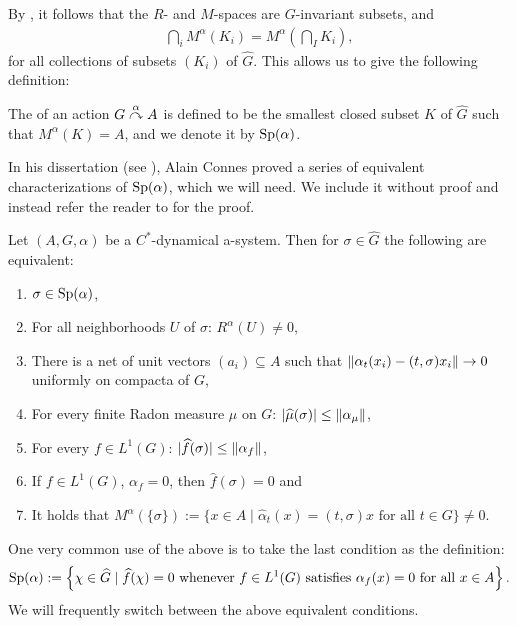 By \cite[Theorem 8.1.4]{pedersenalgauto}, it follows that the $R$- and $M$-spaces are $G$-invariant subsets, and
\begin{align*}
	\bigcap_i M^\alpha(K_i) = M^\alpha(\bigcap_I K_i),
\end{align*}
for all collections of subsets $(K_i)$ of $\hat G$. This allows us to give the following definition:
\begin{definition}
	The  of an action $G \stackrel{\alpha}{\curvearrowright} A$ is defined to be the smallest closed subset $K$ of $\hat G$ such that $M^\alpha(K) = A$, and we denote it by $\mathrm{Sp}(\alpha)$.
\end{definition}
In his dissertation (see \cite{connesclassification}), Alain Connes proved a series of equivalent characterizations of $\mathrm{Sp}(\alpha)$, which we will need. We include it without proof and instead refer the reader to \cite[Proposition 8.1.9 and 8.1.8]{pedersenalgauto} for the proof.
\begin{proposition}
	Let $(A, G, \alpha)$ be a $C^*$-dynamical a-system. Then for $\sigma \in \hat G$ the following are equivalent:
	\begin{enumerate}
		\item $\sigma \in \mathrm{Sp}(\alpha)$,
		\item For all neighborhoods $U$ of $\sigma$: $R^\alpha(U) \neq 0$,
		\item There is a net of unit vectors $(a_i) \subseteq A$ such that $\left\lVert\alpha_t(x_i) - (t,\sigma)x_i\right\rVert \to 0$ uniformly on compacta of $G$,
		\item For every finite Radon measure $\mu$ on $G$: $|\widehat{\mu}(\sigma)| \leq \left\lVert \alpha_\mu\right\rVert$,
		\item For every $f \in L^1(G)$: $|\widehat{f} (\sigma)| \leq \left\lVert \alpha_f\right\rVert$,
		\item If $f \in L^1(G)$, $\alpha_f=0$, then $\hat f(\sigma)=0$ and
		\item It holds that $M^{\alpha}(\{\sigma\}) := \{x \in A \mid \hat \alpha_t(x) = (t,\sigma)x \text{ for all } t \in G\} \neq 0$.
	\end{enumerate}
\end{proposition}
One very common use of the above is to take the last condition as the definition:
\begin{align*}
		\mathrm{Sp}(\alpha) := \left\{ \chi \in \widehat{G} \mid \widehat{f}(\chi) = 0 \text{ whenever } f \in L^1(G) \text{ satisfies } \alpha_f(x) = 0 \text{ for all } x \in A  \right\}.
	\end{align*}
We will frequently switch between the above equivalent conditions.

